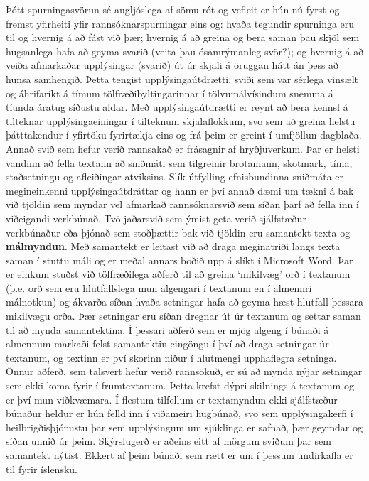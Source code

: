 \documentclass{../../metanetpaper}
\begin{document}
\begin{multicols}{2}
Þótt spurningasvörun sé augljóslega af sömu rót og vefleit er hún nú fyrst og fremst yfirheiti yfir rannsóknarspurningar eins og: hvaða tegundir spurninga eru til og hvernig á að fást við þær; hvernig á að greina og bera saman þau skjöl sem hugsanlega hafa að geyma svarið (veita þau ósamrýmanleg svör?); og hvernig á að veiða afmarkaðar upplýsingar (svarið) út úr skjali á öruggan hátt án þess að hunsa samhengið.
Þetta tengist upplýsingaútdrætti, sviði sem var sérlega vinsælt og áhrifaríkt á tímum tölfræðibyltingarinnar í tölvumálvísindum snemma á tíunda áratug síðustu aldar. Með upplýsingaútdrætti er reynt að bera kennsl á tilteknar upplýsingaeiningar í tilteknum skjalaflokkum, svo sem að greina helstu þátttakendur í yfirtöku fyrirtækja eins og frá þeim er greint í umfjöllun dagblaða. Annað svið sem hefur verið rannsakað er frásagnir af hryðjuverkum. Þar er helsti vandinn að fella textann að sniðmáti sem tilgreinir brotamann, skotmark, tíma, staðsetningu og afleiðingar atviksins. Slík útfylling efnisbundinna sniðmáta er megineinkenni upplýsingaútdráttar og hann er því annað dæmi um tækni á bak við tjöldin sem myndar vel afmarkað rannsóknarsvið sem síðan þarf að fella inn í viðeigandi verkbúnað.  Tvö jaðarsvið sem ýmist geta verið sjálfstæður verkbúnaður eða þjónað sem stoðþættir bak við tjöldin eru samantekt texta og \textbf{málmyndun}. Með samantekt er leitast við að draga meginatriði langs texta saman í stuttu máli og er meðal annars boðið upp á slíkt í Microsoft Word. Þar er einkum stuðst við tölfræðilega aðferð til að greina ‘mikilvæg’ orð í textanum (þ.e. orð sem eru hlutfallslega mun algengari í textanum en í almennri málnotkun) og ákvarða síðan hvaða setningar hafa að geyma hæst hlutfall þessara mikilvægu orða. Þær setningar eru síðan dregnar út úr textanum og settar saman til að mynda samantektina. Í þessari aðferð sem er mjög algeng í búnaði á almennum markaði felst samantektin eingöngu í því að draga setningar úr textanum, og textinn er því skorinn niður í hlutmengi upphaflegra setninga. Önnur aðferð, sem talsvert hefur verið rannsökuð, er sú að mynda nýjar setningar sem ekki koma fyrir í frumtextanum. Þetta krefst dýpri skilnings á textanum og er því mun viðkvæmara. Í flestum tilfellum er textamyndun ekki sjálfstæður búnaður heldur er hún felld inn í viðameiri hugbúnað, svo sem upplýsingakerfi í heilbrigðisþjónustu þar sem upplýsingum um sjúklinga er safnað, þær geymdar og síðan unnið úr þeim. Skýrslugerð er aðeins eitt af mörgum sviðum þar sem samantekt nýtist.
Ekkert af þeim búnaði sem rætt er um í þessum undirkafla er til fyrir íslensku.


\end{multicols}
\end{document}

